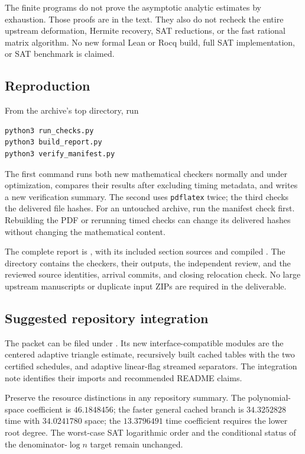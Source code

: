 The finite programs do not prove the asymptotic analytic estimates by
exhaustion. Those proofs are in the text. They also do not recheck the
entire upstream deformation, Hermite recovery, SAT reductions, or the
fast rational matrix algorithm. No new formal Lean or Rocq build, full
SAT implementation, or SAT benchmark is claimed.

\subsection{Reproduction}

From the archive's top directory, run
\begin{verbatim}
python3 run_checks.py
python3 build_report.py
python3 verify_manifest.py
\end{verbatim}
The first command runs both new mathematical checkers normally and under
optimization, compares their results after excluding timing metadata,
and writes a new verification summary. The second uses
\texttt{pdflatex} twice; the third checks the delivered file hashes.
For an untouched archive, run the manifest check first. Rebuilding the
PDF or rerunning timed checks can change its delivered hashes without
changing the mathematical content.

The complete report is , with its included
section sources and compiled .
The  directory contains the checkers, 
their outputs,  the independent review, and
 the reviewed source identities, arrival commits,
and closing relocation check. No large upstream manuscripts or
duplicate input ZIPs are required in the deliverable.

\subsection{Suggested repository integration}

The packet can be filed under
.
Its new interface-compatible modules are the centered adaptive
triangle estimate, recursively built cached tables with the two
certified schedules, and adaptive linear-flag streamed separators.
The integration note identifies their imports and recommended README
claims.

Preserve the resource distinctions in any repository summary.
The polynomial-space coefficient is $46.1848456$; the faster general
cached branch is $34.3252828$ time with $34.0241780$ space;
the $13.3796491$ time coefficient requires the lower root degree.
The worst-case SAT logarithmic order and the conditional status of
the denominator-$\log n$ target remain unchanged.
